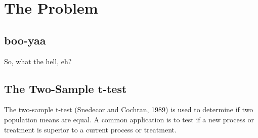 \chapter{The Problem}
\section{boo-yaa}
So, what the hell, eh?
\section{The Two-Sample t-test}
The two-sample t-test (Snedecor and Cochran, 1989) is used to determine
if two population means are equal. A common application is to test if
a new process or treatment is superior to a current process or treatment.

\begin{verbatim}

\end{verbatim}
